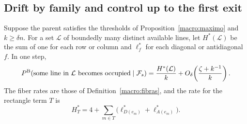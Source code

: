 \subsection{Drift by family and control up to the first exit}\label{macro:control}

\begin{lema}\label{macro:deriva}
Suppose the parent satisfies the thresholds of Proposition~\ref{macro:maximo} and $k\ge\delta n$.
For a set $\mathcal L$ of boundedly many distinct available lines, let $H^*(\mathcal L)$ be the sum
of one for each row or column and $\ell_f^*$ for each diagonal or antidiagonal $f$. In one step,
\[
 P^{\rm B}(\text{some line in }\mathcal L\text{ becomes occupied}\mid\mathcal F_s)
 =\frac{H^*(\mathcal L)}{k}
       +O_\delta\!\left(\frac{\zeta+k^{-1}}{k}\right).
\]
The fiber rates are those of Definition~\ref{macro:fibras}, and the rate for the rectangle term $T$
is
\[
 H_T^*=4+\sum_{m\in T}\bigl(\ell_{D(e_m)}^*+\ell_{A(e_m)}^*\bigr).
\]
\end{lema}
